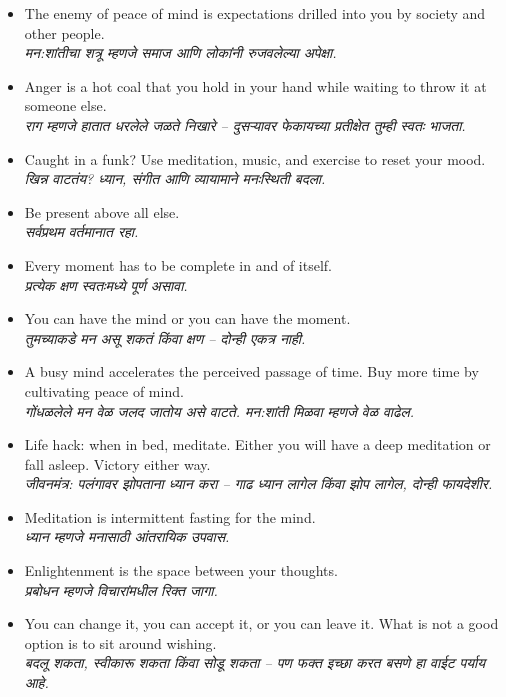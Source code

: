 \begin{itemize}
  \item The enemy of peace of mind is expectations drilled into you by society and other people. \\
  \textit{मन:शांतीचा शत्रू म्हणजे समाज आणि लोकांनी रुजवलेल्या अपेक्षा.}

  \item Anger is a hot coal that you hold in your hand while waiting to throw it at someone else. \\
  \textit{राग म्हणजे हातात धरलेले जळते निखारे – दुसऱ्यावर फेकायच्या प्रतीक्षेत तुम्ही स्वतः भाजता.}

  \item Caught in a funk? Use meditation, music, and exercise to reset your mood. \\
  \textit{खिन्न वाटतंय? ध्यान, संगीत आणि व्यायामाने मनःस्थिती बदला.}

  \item Be present above all else. \\
  \textit{सर्वप्रथम वर्तमानात रहा.}

  \item Every moment has to be complete in and of itself. \\
  \textit{प्रत्येक क्षण स्वतःमध्ये पूर्ण असावा.}

  \item You can have the mind or you can have the moment. \\
  \textit{तुमच्याकडे मन असू शकतं किंवा क्षण – दोन्ही एकत्र नाही.}

  \item A busy mind accelerates the perceived passage of time. Buy more time by cultivating peace of mind. \\
  \textit{गोंधळलेले मन वेळ जलद जातोय असे वाटते. मन:शांती मिळवा म्हणजे वेळ वाढेल.}

  \item Life hack: when in bed, meditate. Either you will have a deep meditation or fall asleep. Victory either way. \\
  \textit{जीवनमंत्र: पलंगावर झोपताना ध्यान करा – गाढ ध्यान लागेल किंवा झोप लागेल, दोन्ही फायदेशीर.}

  \item Meditation is intermittent fasting for the mind. \\
  \textit{ध्यान म्हणजे मनासाठी आंतरायिक उपवास.}

  \item Enlightenment is the space between your thoughts. \\
  \textit{प्रबोधन म्हणजे विचारांमधील रिक्त जागा.}

  \item You can change it, you can accept it, or you can leave it. What is not a good option is to sit around wishing. \\
  \textit{बदलू शकता, स्वीकारू शकता किंवा सोडू शकता – पण फक्त इच्छा करत बसणे हा वाईट पर्याय आहे.}
\end{itemize}

